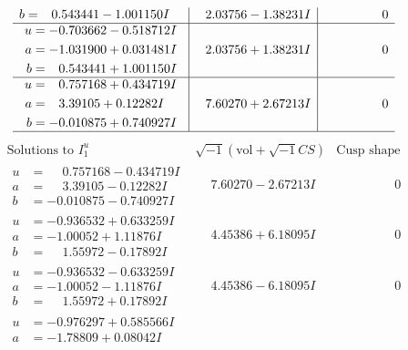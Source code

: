 \documentclass[1p]{elsarticle_modified}
\theoremstyle{definition}
\newcommand{\I}{\sqrt{-1}}
\begin{document}
$$\begin{array}{c|c|c}
\begin{aligned}
b &= \phantom{-}0.543441 - 1.001150 I\end{aligned}
 & \phantom{-}2.03756 - 1.38231 I & \phantom{-0.000000 } 0 \\ \hline\begin{aligned}
u &= -0.703662 - 0.518712 I \\
a &= -1.031900 + 0.031481 I \\
b &= \phantom{-}0.543441 + 1.001150 I\end{aligned}
 & \phantom{-}2.03756 + 1.38231 I & \phantom{-0.000000 } 0 \\ \hline\begin{aligned}
u &= \phantom{-}0.757168 + 0.434719 I \\
a &= \phantom{-}3.39105 + 0.12282 I \\
b &= -0.010875 + 0.740927 I\end{aligned}
 & \phantom{-}7.60270 + 2.67213 I & \phantom{-0.000000 } 0\\
 \hline 
 \end{array}$$\newpage$$\begin{array}{c|c|c}  
\text{Solutions to }I^u_{1}& \I (\text{vol} + \sqrt{-1}CS) & \text{Cusp shape}\\
 \hline 
\begin{aligned}
u &= \phantom{-}0.757168 - 0.434719 I \\
a &= \phantom{-}3.39105 - 0.12282 I \\
b &= -0.010875 - 0.740927 I\end{aligned}
 & \phantom{-}7.60270 - 2.67213 I & \phantom{-0.000000 } 0 \\ \hline\begin{aligned}
u &= -0.936532 + 0.633259 I \\
a &= -1.00052 + 1.11876 I \\
b &= \phantom{-}1.55972 - 0.17892 I\end{aligned}
 & \phantom{-}4.45386 + 6.18095 I & \phantom{-0.000000 } 0 \\ \hline\begin{aligned}
u &= -0.936532 - 0.633259 I \\
a &= -1.00052 - 1.11876 I \\
b &= \phantom{-}1.55972 + 0.17892 I\end{aligned}
 & \phantom{-}4.45386 - 6.18095 I & \phantom{-0.000000 } 0 \\ \hline\begin{aligned}
u &= -0.976297 + 0.585566 I \\
a &= -1.78809 + 0.08042 I \\

\end{aligned}
\end{array}$$
\end{document}
